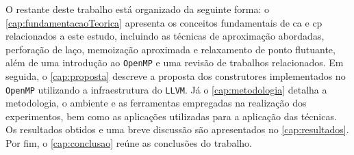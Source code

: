O restante deste trabalho está organizado da seguinte forma: o \autoref{cap:fundamentacaoTeorica} apresenta os conceitos fundamentais de \gls{ca} e \gls{cp} relacionados a este estudo, incluindo as técnicas de aproximação abordadas, perforação de laço, memoização aproximada e relaxamento de ponto flutuante, além de uma introdução ao \texttt{OpenMP} e uma revisão de trabalhos relacionados. Em seguida, o \autoref{cap:proposta} descreve a proposta dos construtores implementados no \texttt{OpenMP} utilizando a infraestrutura do \texttt{LLVM}. Já o \autoref{cap:metodologia} detalha a metodologia, o ambiente e as ferramentas empregadas na realização dos experimentos, bem como as aplicações utilizadas para a aplicação das técnicas. Os resultados obtidos e uma breve discussão são apresentados no \autoref{cap:resultados}. Por fim, o \autoref{cap:conclusao} reúne as conclusões do trabalho.
